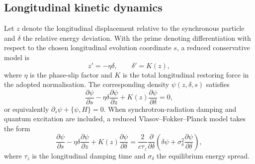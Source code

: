 \subsection{Longitudinal kinetic dynamics}

Let $z$ denote the longitudinal displacement relative to the synchronous particle and $\delta$ the relative energy deviation. With the prime denoting differentiation with respect to the chosen longitudinal evolution coordinate $s$, a reduced conservative model is
\begin{equation}
    z'=-\eta\delta,
    \qquad
    \delta'=K(z),
    \label{eq:longitudinal_hamiltonian_equations}
\end{equation}
where $\eta$ is the phase-slip factor and $K$ is the total longitudinal restoring force in the adopted normalisation. The corresponding density $\psi(z,\delta,s)$ satisfies
\begin{equation}
    \frac{\partial\psi}{\partial s}
    -\eta\delta\frac{\partial\psi}{\partial z}
    +K(z)\frac{\partial\psi}{\partial\delta}
    =0,
    \label{eq:vlasov_revised}
\end{equation}
or equivalently $\partial_s\psi+\{\psi,H\}=0$. When synchrotron-radiation damping and quantum excitation are included, a reduced Vlasov--Fokker--Planck model takes the form
\begin{equation}
    \frac{\partial\psi}{\partial s}
    -\eta\delta\frac{\partial\psi}{\partial z}
    +K(z)\frac{\partial\psi}{\partial\delta}
    =
    \frac{2}{c\tau_z}
    \frac{\partial}{\partial\delta}
    \left(
        \delta\psi
        +\sigma_{\delta}^{2}\frac{\partial\psi}{\partial\delta}
    \right),
    \label{eq:vfp_revised}
\end{equation}
where $\tau_z$ is the longitudinal damping time and $\sigma_{\delta}$ the equilibrium energy spread.

